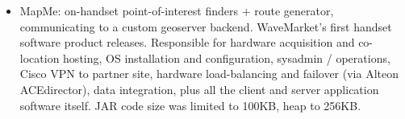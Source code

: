 \begin{itemize}
  		\item MapMe: on-handset point-of-interest finders + route generator, communicating to a custom geoserver
		backend. WaveMarket’s first handset software product releases. Responsible for hardware acquisition
		and co-location hosting,
		OS installation and configuration, sysadmin / operations, Cisco VPN to partner site, hardware load-balancing
		and failover (via Alteon ACEdirector), data integration, plus all the client and server application software itself.
		JAR code size was limited to 100KB, heap to 256KB.
		
	\end{itemize}







